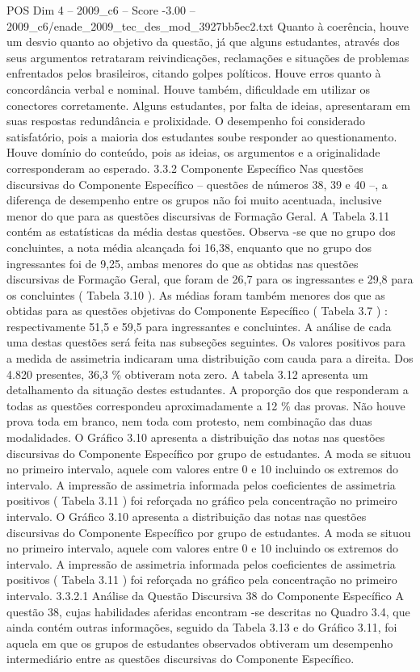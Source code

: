 \begin{textsample}{POS Dim 4 – 2009\_c6 – Score -3.00 – 2009\_c6/enade\_2009\_tec\_des\_mod\_3927bb5ec2.txt}
Quanto à coerência, houve um desvio quanto ao objetivo da questão, já que alguns estudantes, através dos seus argumentos retrataram reivindicações, reclamações e situações de problemas enfrentados pelos brasileiros, citando golpes políticos.
Houve erros quanto à concordância verbal e nominal.
Houve também, dificuldade em utilizar os conectores corretamente.
Alguns estudantes, por falta de ideias, apresentaram em suas respostas redundância e prolixidade.
O desempenho foi considerado satisfatório, pois a maioria dos estudantes soube responder ao questionamento.
Houve domínio do conteúdo, pois as ideias, os argumentos e a originalidade corresponderam ao esperado. 3.3.2 Componente Específico Nas questões discursivas do Componente Específico – questões de números 38, 39 e 40 –, a diferença de desempenho entre os grupos não foi muito acentuada, inclusive menor do que para as questões discursivas de Formação Geral.
A Tabela 3.11 contém as estatísticas da média destas questões.
Observa -se que no grupo dos concluintes, a nota média alcançada foi 16,38, enquanto que no grupo dos ingressantes foi de 9,25, ambas menores do que as obtidas nas questões discursivas de Formação Geral, que foram de 26,7 para os ingressantes e 29,8 para os concluintes ( Tabela 3.10 ).
As médias foram também menores dos que as obtidas para as questões objetivas do Componente Específico ( Tabela 3.7 ) : respectivamente 51,5 e 59,5 para ingressantes e concluintes.
A análise de cada uma destas questões será feita nas subseções seguintes.
Os valores positivos para a medida de assimetria indicaram uma distribuição com cauda para a direita.
Dos 4.820 presentes, 36,3 \% obtiveram nota zero.
A tabela 3.12 apresenta um detalhamento da situação destes estudantes.
A proporção dos que responderam a todas as questões correspondeu aproximadamente a 12 \% das provas.
Não houve prova toda em branco, nem toda com protesto, nem combinação das duas modalidades.
O Gráfico 3.10 apresenta a distribuição das notas nas questões discursivas do Componente Específico por grupo de estudantes.
A moda se situou no primeiro intervalo, aquele com valores entre 0 e 10 incluindo os extremos do intervalo.
A impressão de assimetria informada pelos coeficientes de assimetria positivos ( Tabela 3.11 ) foi reforçada no gráfico pela concentração no primeiro intervalo.
O Gráfico 3.10 apresenta a distribuição das notas nas questões discursivas do Componente Específico por grupo de estudantes.
A moda se situou no primeiro intervalo, aquele com valores entre 0 e 10 incluindo os extremos do intervalo.
A impressão de assimetria informada pelos coeficientes de assimetria positivos ( Tabela 3.11 ) foi reforçada no gráfico pela concentração no primeiro intervalo. 3.3.2.1 Análise da Questão Discursiva 38 do Componente Específico A questão 38, cujas habilidades aferidas encontram -se descritas no Quadro 3.4, que ainda contém outras informações, seguido da Tabela 3.13 e do Gráfico 3.11, foi aquela em que os grupos de estudantes observados obtiveram um desempenho intermediário entre as questões discursivas do Componente Específico.

\end{textsample}
